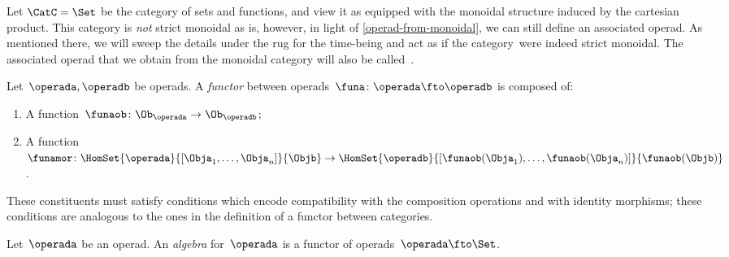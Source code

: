 \begin{example}
    Let $\CatC = \Set$ be the category of sets and functions, and view it as equipped with the monoidal structure induced by the cartesian product.
    This category is \emph{not} strict monoidal as is, however, in light of \cref{operad-from-monoidal}, we can still define an associated operad.
    As mentioned there, we will sweep the details under the rug for the time-being and act as if the category~\Set were indeed strict monoidal.
    The associated operad that we obtain from the monoidal category \Set will also be called~\Set.
\end{example}

\begin{ctdefinition}
    \label{def:functors_operads}
    Let~$\operada,\operadb$ be operads.
    A \emph{functor} between operads~$\funa\colon \operada \fto \operadb$  is composed of:
    \begin{enumerate}
        \item A function~$\funaob\colon \Ob_\operada\to \Ob_\operadb$;
        \item A function~$\funamor\colon \HomSet{\operada}{[\Obja_1,\ldots,\Obja_n]}{\Objb}\to \HomSet{\operadb}{[\funaob(\Obja_1),\ldots, \funaob(\Obja_n)]}{\funaob(\Objb)}$.
    \end{enumerate}
    These constituents must satisfy conditions which encode compatibility with the composition operations and with identity morphisms; these conditions are analogous to the ones in the definition of a functor between categories.
\end{ctdefinition}


\begin{definition}
    \label{def:algebra_operad}
    Let~$\operada$ be an operad.
    An \emph{algebra} for~$\operada$ is a functor of operads~$\operada \fto \Set$.
\end{definition}


